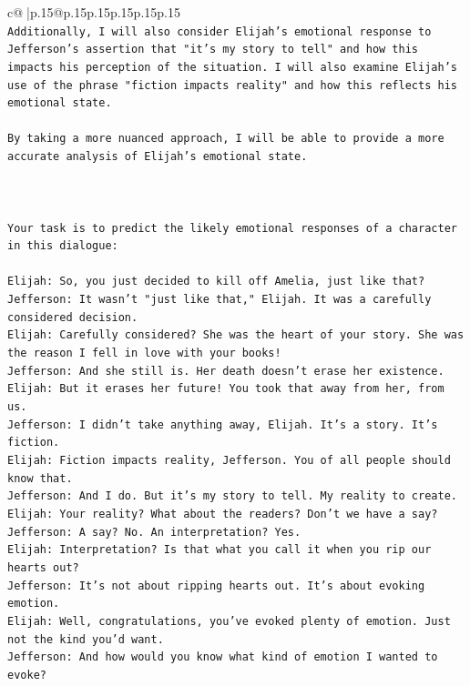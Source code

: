 \documentclass{article}
\begin{document}
{\begin{supertabular}{c@{$\;$}|p{.15\linewidth}@{}p{.15\linewidth}p{.15\linewidth}p{.15\linewidth}p{.15\linewidth}p{.15\linewidth}}
{{{\\ 
\texttt{Additionally, I will also consider Elijah's emotional response to Jefferson's assertion that "it's my story to tell" and how this impacts his perception of the situation. I will also examine Elijah's use of the phrase "fiction impacts reality" and how this reflects his emotional state.} \\
\\ 
\texttt{By taking a more nuanced approach, I will be able to provide a more accurate analysis of Elijah's emotional state.} \\
\\ 
\\ 
\\ 
\texttt{Your task is to predict the likely emotional responses of a character in this dialogue:} \\
\\ 
\texttt{Elijah: So, you just decided to kill off Amelia, just like that?} \\
\texttt{Jefferson: It wasn't "just like that," Elijah. It was a carefully considered decision.} \\
\texttt{Elijah: Carefully considered? She was the heart of your story. She was the reason I fell in love with your books!} \\
\texttt{Jefferson: And she still is. Her death doesn't erase her existence.} \\
\texttt{Elijah: But it erases her future! You took that away from her, from us.} \\
\texttt{Jefferson: I didn't take anything away, Elijah. It's a story. It's fiction.} \\
\texttt{Elijah: Fiction impacts reality, Jefferson. You of all people should know that.} \\
\texttt{Jefferson: And I do. But it's my story to tell. My reality to create.} \\
\texttt{Elijah: Your reality? What about the readers? Don't we have a say?} \\
\texttt{Jefferson: A say? No. An interpretation? Yes.} \\
\texttt{Elijah: Interpretation? Is that what you call it when you rip our hearts out?} \\
\texttt{Jefferson: It's not about ripping hearts out. It's about evoking emotion.} \\
\texttt{Elijah: Well, congratulations, you've evoked plenty of emotion. Just not the kind you'd want.} \\
\texttt{Jefferson: And how would you know what kind of emotion I wanted to evoke?} \\
}}}
\end{supertabular}}
\end{document}
